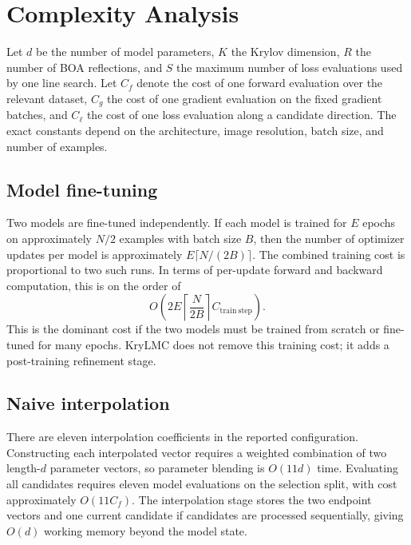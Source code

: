 \documentclass[11pt,a4paper]{article}
\begin{document}
\section{Complexity Analysis}

Let $d$ be the number of model parameters, $K$ the Krylov dimension, $R$ the number of BOA reflections, and $S$ the maximum number of loss evaluations used by one line search. Let $C_f$ denote the cost of one forward evaluation over the relevant dataset, $C_g$ the cost of one gradient evaluation on the fixed gradient batches, and $C_\ell$ the cost of one loss evaluation along a candidate direction. The exact constants depend on the architecture, image resolution, batch size, and number of examples.

\subsection{Model fine-tuning}
Two models are fine-tuned independently. If each model is trained for $E$ epochs on approximately $N/2$ examples with batch size $B$, then the number of optimizer updates per model is approximately $E\lceil N/(2B)\rceil$. The combined training cost is proportional to two such runs. In terms of per-update forward and backward computation, this is on the order of
\begin{equation}
 O\!\left(2E\left\lceil\frac{N}{2B}\right\rceil C_{\mathrm{train\ step}}\right).
\end{equation}
This is the dominant cost if the two models must be trained from scratch or fine-tuned for many epochs. KryLMC does not remove this training cost; it adds a post-training refinement stage.

\subsection{Naive interpolation}
There are eleven interpolation coefficients in the reported configuration. Constructing each interpolated vector requires a weighted combination of two length-$d$ parameter vectors, so parameter blending is $O(11d)$ time. Evaluating all candidates requires eleven model evaluations on the selection split, with cost approximately $O(11C_f)$. The interpolation stage stores the two endpoint vectors and one current candidate if candidates are processed sequentially, giving $O(d)$ working memory beyond the model state.
\end{document}
